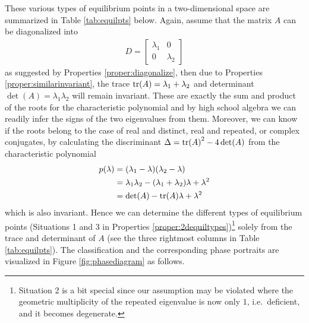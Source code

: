 These various types of equilibrium points in a two-dimensional space are summarized in Table \ref{tab:equilpts} below. Again, assume that the matrix $A$ can be diagonalized into 
\begin{align*}
D = 
\begin{bmatrix}
\lambda_1 & 0 \\
0 & \lambda_2
\end{bmatrix}
\end{align*}
as suggested by Properties \ref{proper:diagonalize}, then due to Properties \ref{proper:similarinvariant}, the trace $\tr(A) = \lambda_1 + \lambda_2$ and determinant $\det(A) = \lambda_1\lambda_2$ will remain invariant. These are exactly the sum and product of the roots for the characteristic polynomial and by high school algebra we can readily infer the signs of the two eigenvalues from them. Moreover, we can know if the roots belong to the case of real and distinct, real and repeated, or complex conjugates, by calculating the discriminant $\Delta = \tr(A)^2 - 4\det(A)$ from the characteristic polynomial 
\begin{align*}
p(\lambda) &= (\lambda_1 - \lambda)(\lambda_2 - \lambda) \\
&= \lambda_1\lambda_2 - (\lambda_1 + \lambda_2)\lambda + \lambda^2 \\
&= \det(A) - \tr(A)\lambda + \lambda^2
\end{align*}
which is also invariant. Hence we can determine the different types of equilibrium points (Situations 1 and 3 in Properties \ref{proper:2dequiltypes})\footnote{Situation 2 is a bit special since our assumption may be violated where the geometric multiplicity of the repeated eigenvalue is now only $1$, i.e.\ deficient, and it becomes degenerate.} solely from the trace and determinant of $A$ (see the three rightmost columns in Table \ref{tab:equilpts}). The classification and the corresponding phase portraits are visualized in Figure \ref{fig:phasediagram} as follows.
